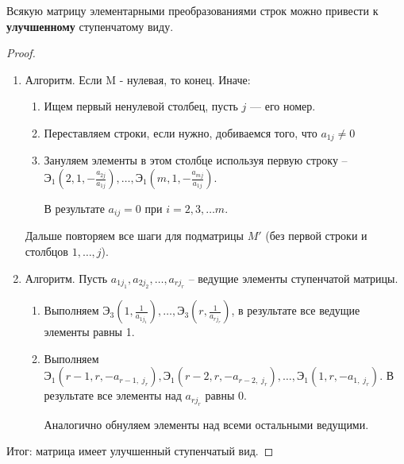 \documentclass[a4paper]{article}
\begin{document}
\begin{colloq}
            \begin{corollary}
                Всякую матрицу элементарными преобразованиями строк можно привести к \textbf{улучшенному} ступенчатому виду.
            \end{corollary}

            \begin{proof}~
                \begin{enumerate}
                \item
                    Алгоритм. Если M - нулевая, то конец. Иначе:
                    \begin{enumerate}[label=Шаг \arabic*:]
                    \item Ищем первый ненулевой столбец, пусть $j$ --- его номер.
                    \item Переставляем строки, если нужно, добиваемся того, что $a_{1j} \neq 0$
                    \item
                        Зануляем элементы в этом столбце используя первую строку --  $\text{Э}_1(2, 1, -\frac{a_{2j}}{a_{1j}}), \dots, \text{Э}_1(m, 1, -\frac{a_{mj}}{a_{1j}})$.

                        В результате $a_{ij} = 0$ при $i = 2, 3, \dots m$.
                    \end{enumerate}
                    Дальше повторяем все шаги для подматрицы $M'$ (без первой строки и столбцов $1, \dots, j$).
                \item
                    Алгоритм. Пусть $a_{1j_1}, a_{2j_2}, \dots, a_{rj_r}$ -- ведущие элементы ступенчатой матрицы.
                    \begin{enumerate}[label=Шаг \arabic*:]
                    \item Выполняем $\text{Э}_3(1, \frac{1}{a_{1j_1}}), \dots, \text{Э}_3(r, \frac{1}{a_{rj_r}})$, в результате все ведущие элементы равны 1.
                    \item Выполняем $\text{Э}_1(r - 1, r, -a_{r - 1, \; j_r}), \text{Э}_1(r - 2, r, -a_{r - 2, \; j_r}), \dots, \text{Э}_1(1, r, -a_{1, \; j_r})$. В результате все элементы над $a_{r j_r}$ равны 0.

                        Аналогично обнуляем элементы над всеми остальными ведущими.
                    \end{enumerate}
                \end{enumerate}
                Итог: матрица имеет улучшенный ступенчатый вид.
            \end{proof}


\end{colloq}
\end{document}
